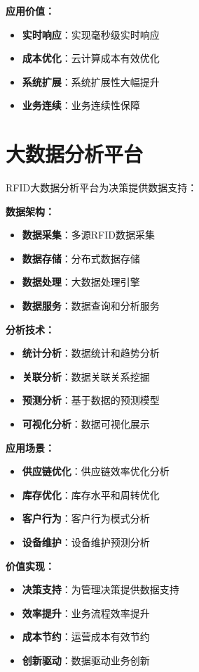 \documentclass[12pt,UTF8]{ctexbook}
\begin{document}
\begin{itemize}[leftmargin=3.5em]
\begin{itemize}[leftmargin=3.5em]
\begin{itemize}[leftmargin=3.5em]
\begin{itemize}[leftmargin=3.5em]
\textbf{应用价值：}
\begin{itemize}[leftmargin=3.5em]
    \item \textbf{实时响应}：实现毫秒级实时响应
    \item \textbf{成本优化}：云计算成本有效优化
    \item \textbf{系统扩展}：系统扩展性大幅提升
    \item \textbf{业务连续}：业务连续性保障
\end{itemize}

\section{大数据分析平台}

RFID大数据分析平台为决策提供数据支持：

\textbf{数据架构：}
\begin{itemize}[leftmargin=3.5em]
    \item \textbf{数据采集}：多源RFID数据采集
    \item \textbf{数据存储}：分布式数据存储
    \item \textbf{数据处理}：大数据处理引擎
    \item \textbf{数据服务}：数据查询和分析服务
\end{itemize}

\textbf{分析技术：}
\begin{itemize}[leftmargin=3.5em]
    \item \textbf{统计分析}：数据统计和趋势分析
    \item \textbf{关联分析}：数据关联关系挖掘
    \item \textbf{预测分析}：基于数据的预测模型
    \item \textbf{可视化分析}：数据可视化展示
\end{itemize}

\textbf{应用场景：}
\begin{itemize}[leftmargin=3.5em]
    \item \textbf{供应链优化}：供应链效率优化分析
    \item \textbf{库存优化}：库存水平和周转优化
    \item \textbf{客户行为}：客户行为模式分析
    \item \textbf{设备维护}：设备维护预测分析
\end{itemize}

\textbf{价值实现：}
\begin{itemize}[leftmargin=3.5em]
    \item \textbf{决策支持}：为管理决策提供数据支持
    \item \textbf{效率提升}：业务流程效率提升
    \item \textbf{成本节约}：运营成本有效节约
    \item \textbf{创新驱动}：数据驱动业务创新
\end{itemize}


\end{itemize}
\end{itemize}
\end{itemize}
\end{itemize}
\end{document}
